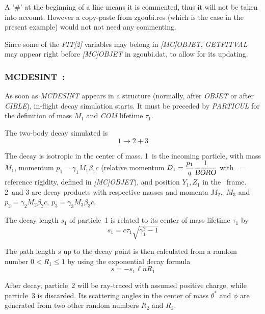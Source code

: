 \noindent A '\#' at the beginning of a line means it is commented, thus it will not be taken into account. 
However a copy-paste from zgoubi.res (which is the case in the present example) would not not need any commenting. 

\medskip

\noindent Since some of the \textsl{FIT[2]} variables may belong in \textsl{[MC]OBJET}, \textsl{GETFITVAL} may appear 
right before  \textsl{[MC]OBJET} in zgoubi.dat, to allow for its updating. 




\newpage

\subsubsection*{MCDESINT~: \MCDESINTTitl \protect\cite{Biblio11}}
\medskip 
\label{MCDESINT}

 As soon as \textsl{MCDESINT}  appears in a structure
(normally, after \textsl{OBJET} or after \textsl{CIBLE}),
 in-flight decay simulation starts. 
It must be preceded by \textsl{PARTICUL} for the definition of mass $ M_1 $ 
and \textsl{COM} 
lifetime $\tau_1$. 

\noindent The two-body decay simulated is 
 $$ 1 \longrightarrow  2+3 $$

\noindent The decay is isotropic in the center of mass. 
1~is the incoming particle, with mass $ M_1 $, momentum $ p_1=\gamma_1 M_1\beta_ 1c $ (relative 
momentum $ D_1= \dfrac{p_1 }{ q} \dfrac{1 }{\textsl{BORO}} $ with \BORO\   = reference
rigidity, defined in \textsl{[MC]OBJET}),  and position $ Y_1,Z_1 $ in the \zgou\ frame. 
2~and 3 are decay products with respective masses and momenta $ M_2, $ $ M_3 $ and 
$ p_2=\gamma_ 2M_2\beta_2c$,  $ p_3=\gamma_ 3M_3\beta_ 3c$.  

\noindent The decay length  $ s_1 $ of particle~1 is related to its center of 
mass lifetime $ \tau_ 1 $ by 
$$ s_1=c\tau_ 1 \sqrt{ \gamma^ 2_1 -1} $$

\noindent The path length $ s $ up to the decay point is then calculated from
a random number $ 0<R_1\leq 1 $ by using the exponential decay formula
$$ s = - s_1 \ell n R_1 $$

\noindent After decay, particle~2  will  be ray-traced with assumed positive
charge, while particle~3 is discarded.  Its scattering angles in the center of mass 
$ \theta^\ast $ and $\phi$ are generated from two other random numbers 
$R_2$ and $ R_3$. 
%
%

